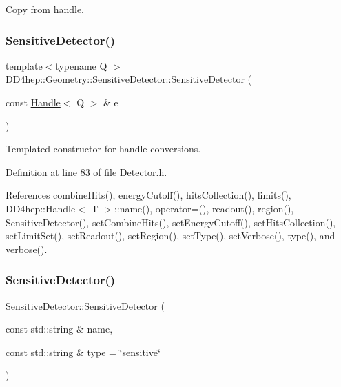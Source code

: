 Copy from handle. 

\hypertarget{class_d_d4hep_1_1_geometry_1_1_sensitive_detector_a3cb77e09e42a85492f87044305b74512}{}\label{class_d_d4hep_1_1_geometry_1_1_sensitive_detector_a3cb77e09e42a85492f87044305b74512} 
\subsubsection{\texorpdfstring{Sensitive\+Detector()}{SensitiveDetector()}\hspace{0.1cm}{\footnotesize\ttfamily [5/6]}}
{\footnotesize\ttfamily template$<$typename Q $>$ \\
D\+D4hep\+::\+Geometry\+::\+Sensitive\+Detector\+::\+Sensitive\+Detector (\begin{DoxyParamCaption}\item[{const \hyperlink{class_d_d4hep_1_1_handle}{Handle}$<$ Q $>$ \&}]{e }\end{DoxyParamCaption})\hspace{0.3cm}{\ttfamily [inline]}}



Templated constructor for handle conversions. 



Definition at line 83 of file Detector.\+h.



References combine\+Hits(), energy\+Cutoff(), hits\+Collection(), limits(), D\+D4hep\+::\+Handle$<$ T $>$\+::name(), operator=(), readout(), region(), Sensitive\+Detector(), set\+Combine\+Hits(), set\+Energy\+Cutoff(), set\+Hits\+Collection(), set\+Limit\+Set(), set\+Readout(), set\+Region(), set\+Type(), set\+Verbose(), type(), and verbose().

\hypertarget{class_d_d4hep_1_1_geometry_1_1_sensitive_detector_a5bc99cbb0d0101285a63e7c95b91561b}{}\label{class_d_d4hep_1_1_geometry_1_1_sensitive_detector_a5bc99cbb0d0101285a63e7c95b91561b} 
\subsubsection{\texorpdfstring{Sensitive\+Detector()}{SensitiveDetector()}\hspace{0.1cm}{\footnotesize\ttfamily [6/6]}}
{\footnotesize\ttfamily Sensitive\+Detector\+::\+Sensitive\+Detector (\begin{DoxyParamCaption}\item[{const std\+::string \&}]{name,  }\item[{const std\+::string \&}]{type = {\ttfamily \char`\"{}sensitive\char`\"{}} }\end{DoxyParamCaption})}



